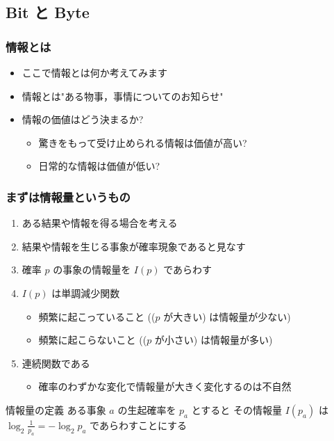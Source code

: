 \subsection{Bit と Byte}
\begin{frame}
\frametitle{情報とは}
  \begin{itemize}
\item ここで情報とは何か考えてみます
\item 情報とは"ある物事，事情についてのお知らせ"
\item 情報の価値はどう決まるか?
    \begin{itemize}
\item 驚きをもって受け止められる情報は価値が高い?
\item 日常的な情報は価値が低い?
    \end{itemize}
  \end{itemize}
\end{frame}
\begin{frame}
\frametitle{まずは情報量というもの}
  \begin{enumerate}
\item ある結果や情報を得る場合を考える
\item 結果や情報を生じる事象が確率現象であると見なす
\item 確率 $p$ の事象の情報量を \(I(p)\) であらわす
\item \(I(p)\) は単調減少関数
    \begin{itemize}
\item 頻繁に起こっていること ((\(p\) が大きい) は情報量が少ない)
\item 頻繁に起こらないこと ((\(p\) が小さい) は情報量が多い)
    \end{itemize}
\item 連続関数である
    \begin{itemize}
\item 確率のわずかな変化で情報量が大きく変化するのは不自然
    \end{itemize}
  \end{enumerate}
  \begin{block}{情報量の定義}
ある事象 $a$ の生起確率を \(p_a\) とすると
その情報量 \(I(p_a)\) は \(\log_{2}\frac{1}{p_a}=-\log_{2}p_a\) であらわすことにする
  \end{block}
\end{frame}
